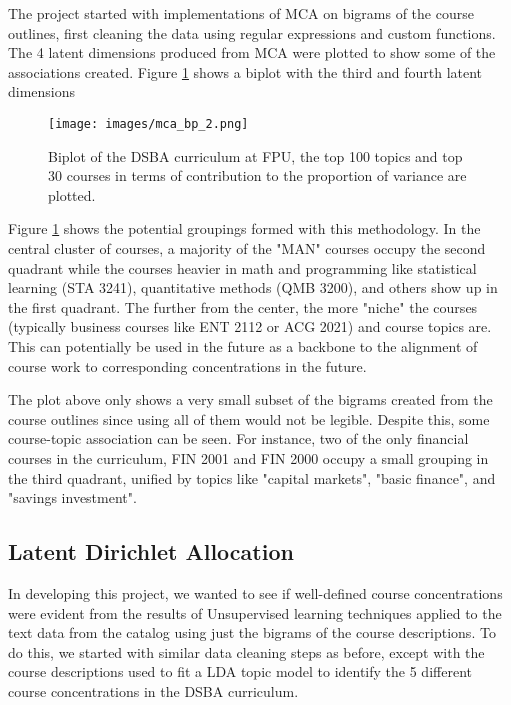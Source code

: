 \documentclass[11pt]{report}
\begin{document}
The project started with implementations of MCA on bigrams of the course outlines,  first cleaning the data using regular expressions \citep{regex} and custom functions.  The 4 latent dimensions produced from MCA were plotted to show some of the associations created.  Figure \ref{fig:mca_2} shows a biplot with the third and fourth latent dimensions


\begin{figure}[H]
\centering

\texttt{[image: images/mca\_bp\_2.png]}
\caption{Biplot of the DSBA curriculum at FPU,  the top 100 topics and top 30 courses in terms of contribution to the proportion of variance are plotted.}
\label{fig:mca_2}
\end{figure}

Figure \ref{fig:mca_2} shows the potential groupings formed with this methodology.  In the central cluster of courses, a majority of the "MAN" courses occupy the second quadrant while the courses heavier in math and programming like statistical learning (STA 3241),  quantitative methods (QMB 3200), and others show up in the first quadrant.  The further from the center, the more "niche" the courses (typically business courses like ENT 2112 or ACG 2021) and course topics are.  This can potentially be used in the future as a backbone to the alignment of course work to corresponding concentrations in the future.

The plot above only shows a very small subset of the bigrams created from the course outlines since using all of them would not be legible.  Despite this,  some course-topic association can be seen.  For instance, two of the only financial courses in the curriculum, FIN 2001 and FIN 2000 occupy a small grouping in the third quadrant, unified by topics like "capital markets", "basic finance", and "savings investment". 

\subsection{Latent Dirichlet Allocation}

In developing this project, we wanted to see if well-defined course concentrations were evident from the results of Unsupervised learning techniques applied to the text data from the catalog using just the bigrams of the course descriptions.  To do this,  we started with similar data cleaning steps as before, except with the course descriptions used to fit a LDA \citep{lda_pap} topic model to identify the 5 different course concentrations in the DSBA curriculum. 
\end{document}
